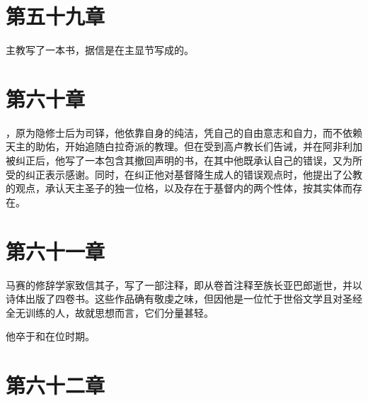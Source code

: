 
\section{第五十九章}

主教写了一本书，据信是在主显节写成的。\par


\section{第六十章}

，原为隐修士后为司铎，他依靠自身的纯洁，凭自己的自由意志和自力，而不依赖天主的助佑，开始追随白拉奇派的教理。但在受到高卢教长们告诫，并在阿非利加被纠正后，他写了一本包含其撤回声明的书，在其中他既承认自己的错误，又为所受的纠正表示感谢。同时，在纠正他对基督降生成人的错误观点时，他提出了公教的观点，承认天主圣子的独一位格，以及存在于基督内的两个性体，按其实体而存在。\par


\section{第六十一章}

马赛的修辞学家致信其子，写了一部注释，即从卷首注释至族长亚巴郎逝世，并以诗体出版了四卷书。这些作品确有敬虔之味，但因他是一位忙于世俗文学且对圣经全无训练的人，故就思想而言，它们分量甚轻。\par

他卒于和在位时期。\par


\section{第六十二章}

